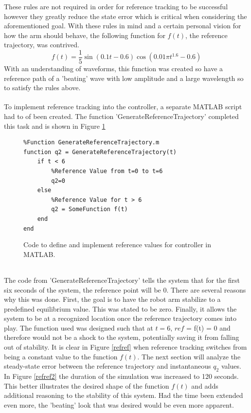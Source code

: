 \documentclass[12pt]{article}
\begin{document}
These rules are not required in order for reference tracking to be successful however they greatly reduce the state error which is critical when considering the aforementioned goal. With these rules in mind and a certain personal vision for how the arm should behave, the following function for $f(t)$, the reference trajectory, was contrived.
\begin{equation*}
	f(t) = \frac{1}{5}\sin(0.1 t - 0.6)\cos(0.01 \pi t^{1.6} - 0.6)
\end{equation*}
With an understanding of waveforms, this function was created so have a reference path of a 'beating' wave with low amplitude and a large wavelength so to satisfy the rules above.
\\ \\
To implement reference tracking into the controller, a separate MATLAB script had to of been created. The function 'GenerateReferenceTrajectory'  completed this task and is shown in Figure \ref{figCodeRef}
\begin{figure}[h!]
\begin{lstlisting}
%Function GenerateReferenceTrajectory.m
function q2 = GenerateReferenceTrajectory(t)
    if t < 6
        %Reference Value from t=0 to t=6
        q2=0
    else
    	%Reference Value for t > 6
        q2 = SomeFunction f(t)
    end
end
\end{lstlisting}
\caption{Code to define and implement reference values for controller in MATLAB. 
\label{figCodeRef}}
\end{figure}
\\
The code from 'GenerateReferenceTrajectory' tells the system that for the first six seconds of the system, the reference point will be 0. There are several reasons why this was done. First, the goal is to have the robot arm stabilize to a predefined equilibrium value. This was stated to be zero. Finally, it allows the system to be at a recognized location once the reference trajectory comes into play. The function used was designed such that at $t=6$, $ref$ = f(t) = 0 and therefore would not be a shock to the system, potentially saving it from falling out of stability. It is clear in Figure \ref{refref} when reference tracking switches from being a constant value to the function $f(t)$. The next section will analyze the steady-state error between the reference trajectory and instantaneous $q_{2}$ values. In Figure \ref{refref2} the duration of the simulation was increased to 120 seconds. This better illustrates the desired shape of the function $f(t)$ and adds additional reasoning to the stability of this system. Had the time been extended even more, the 'beating' look that was desired would be even more apparent.
\end{document}
